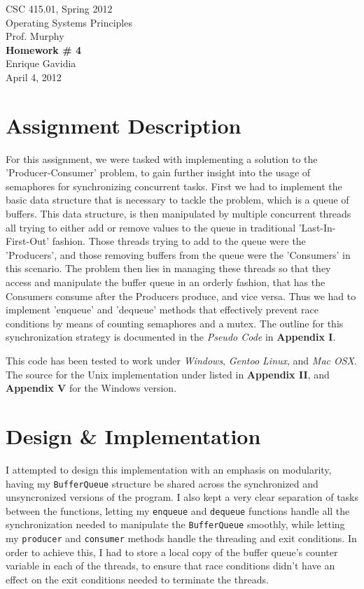 \documentclass[12pt]{article}
\def \name       {Enrique Gavidia}
\def \coursenum  {CSC 415.01}
\def \coursename {Operating Systems Principles}
\def \instructor {Prof. Murphy}
\def \semester   {Spring 2012}
\def \assignment {Homework \# 4}
\def \duedate    {April 4, 2012}
\newcommand {\makecover} {
  \begin{titlepage}
    \begin{center}
      \LARGE{\coursenum, \semester \\ \coursename}\\
      \Large{\instructor}\\
      \vfill
      \textbf{\Huge \assignment}\\
      \vfill
      \Large{\name}\\
      \large{\duedate}
    \end{center}
  \end{titlepage}
}
\begin{document}
\makecover

\section*{Assignment Description}
For this assignment, we were tasked with implementing a solution to the 'Producer-Consumer' problem, to gain further insight into the
usage of semaphores for synchronizing concurrent tasks.  First we had to implement the basic data structure that is necessary to tackle
the problem, which is a queue of buffers. This data structure, is then  manipulated by multiple concurrent threads all trying to either add or remove
values to the queue in traditional 'Last-In-First-Out' fashion. Those threads trying to add to the queue were the 'Producers', and those removing
buffers from the queue were the 'Consumers' in this scenario.  The problem then lies in managing these threads so that they access and manipulate
the buffer queue in an orderly fashion, that has the Consumers consume after the Producers produce, and vice versa.  Thus we had to implement 'enqueue' 
and 'dequeue' methods that effectively prevent race conditions by means of counting semaphores and a mutex. The outline for this synchronization
strategy is documented in the \textsl{Pseudo Code} in \textbf{Appendix I}.

This code has been tested to work under \textsl{Windows}, \textsl{Gentoo Linux}, and \textsl{Mac OSX}.
The source for the Unix implementation under listed in \textbf{Appendix II}, and \textbf{Appendix V} for the Windows version.


\section*{Design \& Implementation}
I attempted to design this implementation with an emphasis on modularity, having my \texttt{BufferQueue} structure be shared across the synchronized
and unsyncronized versions of the program. I also kept a very clear separation of tasks between the functions, letting my \texttt{enqueue} and \texttt{dequeue} 
functions handle all the synchronization needed to manipulate the \texttt{BufferQueue} smoothly, while letting my \texttt{producer} and \texttt{consumer}
methods handle the threading and exit conditions. In order to achieve this, I had to store a local copy of the buffer queue's counter variable in each of the
threads, to ensure that race conditions didn't have an effect on the exit conditions needed to terminate the threads.
\end{document}
